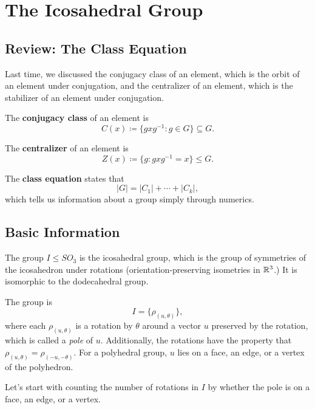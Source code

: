 
\section{The Icosahedral Group}

\subsection{Review: The Class Equation}
Last time, we discussed the conjugacy class of an element, which is the orbit of an element under conjugation, and the centralizer of an element, which is the stabilizer of an element under conjugation. 
\begin{definition}
The \textbf{conjugacy class} of an element is 
\[
C(x) \coloneqq \{gxg^{-1} : g \in G\} \subseteq G.
\]
\end{definition}

\begin{definition}
The \textbf{centralizer} of an element is 
\[
Z(x) \coloneqq \{g: gxg^{-1} = x\} \leq G.
\]
\end{definition}

The \textbf{class equation} states that 
\[
|G| = |C_1| + \cdots + |C_k|,
\]
which tells us information about a group simply through numerics.

\subsection{Basic Information}
The group $I \leq SO_3$ is the icosahedral group, which is the group of symmetries of the icosahedron under rotations (orientation-preserving isometries in $\mathbb R^3$.) It is isomorphic to the dodecahedral group.

The group is \[I = \{\rho_{(u, \theta)}\},\] where each $\rho_{(u, \theta)}$ is a rotation by $\theta$ around a vector $u$ preserved by the rotation, which is called a \emph{pole} of $u.$ Additionally, the rotations have the property that $\rho_{(u, \theta)} = \rho_{(-u, -\theta)}.$ For a polyhedral group, $u$ lies on a face, an edge, or a vertex of the polyhedron. 

Let's start with counting the number of rotations in $I$ by whether the pole is on a face, an edge, or a vertex.

